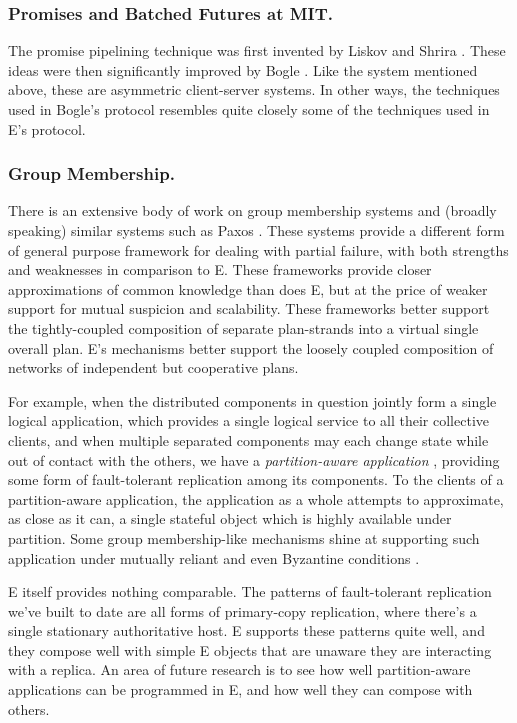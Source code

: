 \documentclass{llncs}
\begin{document}
\subsubsection{Promises and Batched Futures at MIT.} The promise
pipelining technique was first invented by Liskov and Shrira
\cite{liskov:promises}. These ideas were then significantly improved
by Bogle \cite{bogle:batched}. Like the  system
mentioned above, these are asymmetric client-server systems. In other
ways, the techniques used in Bogle's protocol resembles quite closely
some of the techniques used in E's protocol.

\subsubsection{Group Membership.} There is an extensive body of work
on group membership systems \cite{birman:vsync,amir:thesis} and
(broadly speaking) similar systems such as Paxos
\cite{lamport:paxos}. These systems provide a different form of
general purpose framework for dealing with partial failure, with both
strengths and weaknesses in comparison to E. These frameworks provide
closer approximations of common knowledge than does E, but at the
price of weaker support for mutual suspicion and scalability. These
frameworks better support the tightly-coupled composition of separate
plan-strands into a virtual single overall plan. E's mechanisms better
support the loosely coupled composition of networks of independent but
cooperative plans.

For example, when the distributed components in question jointly form
a single logical application, which provides a single logical service
to all their collective clients, and when multiple separated
components may each change state while out of contact with the others,
we have a \emph{partition-aware application}
\cite{partition-aware,bancomat}, providing some form of fault-tolerant
replication among its components. To the clients of a partition-aware
application, the application as a whole attempts to approximate, as
close as it can, a single stateful object which is highly available
under partition. Some group membership-like mechanisms shine at
supporting such application under mutually reliant and even Byzantine
conditions \cite{castro:bft}.

E itself provides nothing comparable. The patterns of fault-tolerant
replication we've built to date are all forms of primary-copy
replication, where there's a single stationary authoritative host. E
supports these patterns quite well, and they compose well with simple
E objects that are unaware they are interacting with a replica. An
area of future research is to see how well partition-aware
applications can be programmed in E, and how well they can compose
with others.
\end{document}
